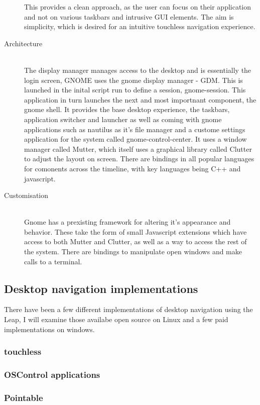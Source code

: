 \documentclass[a4paper]{article}
\begin{document}
\begin{description}
This provides a clean approach, as the user can focus on their application and not on various taskbars and intrusive GUI elements. The aim is simplicity, which is desired for an intuitive touchless navigation experience.	
\item[Architecture]{\hfill \\
The display manager manages access to the desktop and is essentially the login screen, GNOME uses the gnome display manager - GDM. This is launched in the inital script run to define a session, gnome-session. 
This application in turn launches the next and most importnant component, the gnome shell. It provides the base desktop experience, the taskbars, application switcher and launcher as well as coming with gnome applications such as nautilus as it's file manager and a custome settings application for the system called gnome-control-center. It uses a window manager called Mutter, which itself uses a graphical library called Clutter to adjust the layout on screen. There are bindings in all popular languages for comonents across the timeline, with key languages being C++ and javascript. 
}
\item[Customisation]{\hfill \\
Gnome has a prexisting framework for altering it's appearance and behavior. These take the form of small Javascript extensions which have access to both Mutter and Clutter, as well as a way to access the rest of the system. There are bindings to manipulate open windows and make calls to a terminal.
}
\end{description}
\newpage


\subsection{Desktop navigation implementations\label{NavigationExamples}}
There have been a few different implementations of desktop navigation using the Leap, I will examine those availabe open source on Linux and a few paid implementations on windows.
\subsubsection{touchless}
\subsubsection{OSControl applications}
\subsubsection{Pointable}
\end{document}
